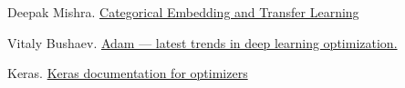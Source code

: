 \documentclass{article}
\begin{document}
\begin{thebibliography}{1}
Deepak Mishra.
\newblock\href{https://towardsdatascience.com/categorical-embedding-and-transfer-learning-dd3c4af6345d}{Categorical Embedding and Transfer Learning}

Vitaly Bushaev.
\newblock\href{https://towardsdatascience.com/adam-latest-trends-in-deep-learning-optimization-6be9a291375c}{Adam — latest trends in deep learning optimization.
}

Keras.
\newblock\href{https://keras.io/optimizers/}{Keras documentation for optimizers}


\end{thebibliography}
\end{document}
